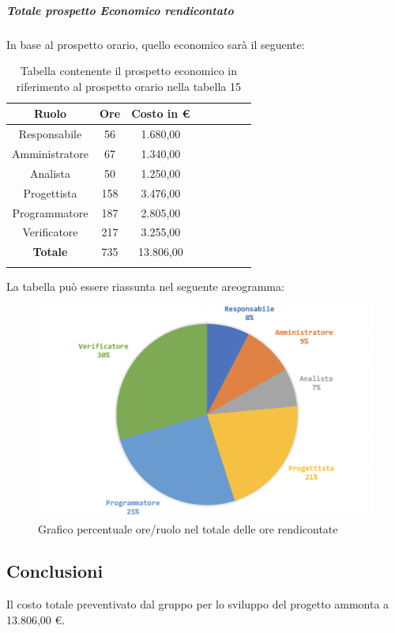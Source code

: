 				\subparagraph{Totale prospetto Economico rendicontato}
				In base al prospetto orario, quello economico sarà il seguente: 
				
				\begin{longtable}{|c|c|c|c|c|c|c|c|}
					\hline
					\rowcolor{lighter-grayer}
					\textbf{Ruolo} & \textbf{Ore} & \textbf{Costo in €} \\
					\hline
					\endfirsthead
					
					\hline
					Responsabile 	    & 56 & 1.680,00\\
					\hline 
					\hline
					Amministratore	  & 67 & 1.340,00\\
					\hline
					\hline
					Analista 				& 50 & 1.250,00\\
					\hline
					\hline
					Progettista 		  & 158 & 3.476,00\\
					\hline
					\hline
					Programmatore 	 & 187 & 2.805,00\\
					\hline
					\hline
					Verificatore 		  & 217 & 3.255,00\\
					\hline
					\textbf{Totale} 	& 735 & 13.806,00\\
					\hline
					\caption{Tabella contenente il prospetto economico in riferimento al prospetto orario nella tabella 15}
				\end{longtable}
				\pagebreak
				
				La tabella può essere riassunta nel seguente areogramma:
				\begin{figure}[H]
					\centering
					\includegraphics[width=0.8\linewidth]{./images/totOreRed2.png}
					\caption{Grafico percentuale ore/ruolo nel totale delle ore rendicontate}
					\label{fig:grafico costi ruolo fase totale ore rendicontate}
				\end{figure}
			
			\subsection{Conclusioni}
				Il costo totale preventivato dal gruppo per lo sviluppo del progetto ammonta a 13.806,00 €.
				
				
		
	
	